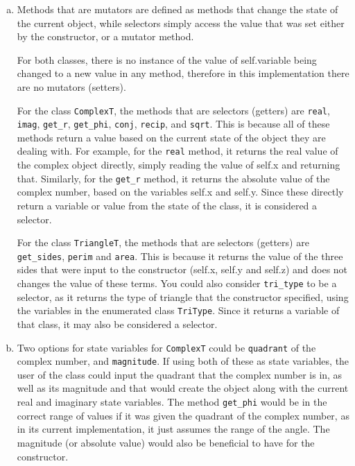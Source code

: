 \documentclass[12pt]{article}
\begin{document}
\begin{enumerate}[(a)]

\item Methods that are mutators are defined as methods that change the state 
of the current object, while selectors simply access the value that was set 
either by the constructor, or a mutator method. 

For both classes, there is no instance of the value of self.variable being 
changed to a new value in any method, therefore in this implementation there 
are no mutators (setters).

For the class \verb|ComplexT|, the methods that are selectors (getters) are 
\verb|real|, \verb|imag|, \verb|get_r|, \verb|get_phi|, \verb|conj|, \verb|recip|, 
and \verb|sqrt|. This is because all of these methods return a value based on the 
current state of the object they are dealing with. For example, for the 
\verb|real| method, it returns the real value of the complex object directly, 
simply reading the value of self.x and returning that. Similarly, for the 
\verb|get_r| method, it returns the absolute value of the complex number, based 
on the variables self.x and self.y. Since these directly return a variable or 
value from the state of the class, it is considered a selector. 

For the class \verb|TriangleT|, the methods that are selectors (getters) are 
\verb|get_sides|, \verb|perim| and \verb|area|. This is because it returns the 
value of the three sides that were input to the constructor (self.x, self.y 
and self.z) and does not changes the value of these terms. You could also consider
 \verb|tri_type| to be a selector, as it returns the type of triangle that the 
 constructor specified, using the variables in the enumerated class \verb|TriType|. 
 Since it returns a variable of that class, it may also be considered a selector. 

\item Two options for state variables for \verb|ComplexT| could be \verb|quadrant| 
of the complex number, and \verb|magnitude|. If using both of these as state 
variables, the user of the class could input the quadrant that the complex number 
is in, as well as its magnitude and that would create the object along with the current real and imaginary state variables. The method \verb|get_phi| would be in the correct range of values if it was given the quadrant of the complex number, as in its current implementation, it just assumes the range of the angle. The magnitude (or absolute value) would also be beneficial to have for the constructor. 


\end{enumerate}
\end{document}
